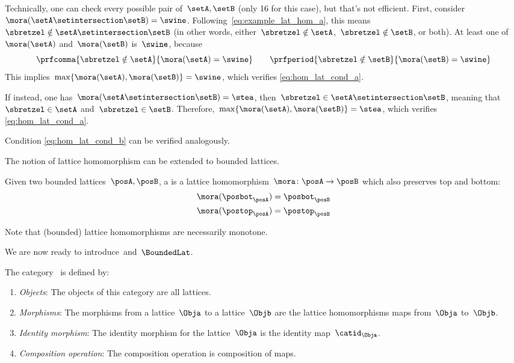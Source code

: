\begin{example}
	Technically, one can check every possible pair of~$\setA,\setB$ (only 16 for this case), but that's not efficient.
	First, consider~$\mora(\setA\setintersection \setB)=\swine$.
	Following~\cref{eq:example_lat_hom_a}, this means~$\sbretzel \notin \setA\setintersection \setB$ (in other words, either~$\sbretzel \notin \setA$,~$\sbretzel \notin \setB$, or both).
	At least one of~$\mora(\setA)$ and~$\mora(\setB)$ is~$\swine$, because
	\begin{equation*}
		\prfcomma{\sbretzel \notin \setA}{\mora(\setA)=\swine} \qquad
		\prfperiod{\sbretzel \notin \setB}{\mora(\setB)=\swine}
	\end{equation*}
	This implies~$\max\{\mora(\setA),\mora(\setB)\}=\swine$, which verifies \cref{eq:hom_lat_cond_a}.

	If instead, one has~$\mora(\setA\setintersection \setB)=\stea$, then~$\sbretzel \in \setA\setintersection \setB$, meaning that~$\sbretzel \in \setA$ and~$\sbretzel \in \setB$.
	Therefore,~$\max\{ \mora(\setA),\mora(\setB)\}=\stea$, which verifies \cref{eq:hom_lat_cond_a}.

	Condition \cref{eq:hom_lat_cond_b} can be verified analogously.
\end{example}

The notion of lattice homomorphism can be extended to bounded lattices.

\begin{ctdefinition}
	\label{def:bounded_lat_homomorphism}
	Given two bounded lattices~$\posA,\posB$, a \emph{} is a lattice homomorphism~$\mora\colon \posA\to \posB$ which also preserves top and bottom:
	\begin{equation}
		\begin{aligned}
			\mora(\posbot_\posA) & =\posbot_\posB \\
			\mora(\postop_\posA) & =\postop_\posB
		\end{aligned}
	\end{equation}
\end{ctdefinition}

Note that (bounded) lattice homomorphisms are necessarily monotone.

We are now ready to introduce~\Lat and~$\BoundedLat$.

\begin{ctdefinition}
	\label{def:Lat}
	The category~\iindex{\Lat} is defined by:
	\begin{enumerate}
		\item \emph{Objects}: The objects of this category are all lattices.
		\item \emph{Morphisms}: The morphisms from a lattice~$\Obja$ to a lattice~$\Objb$ are the lattice homomorphisms maps from~$\Obja$ to~$\Objb$.
		\item \emph{Identity morphism}: The identity morphism for the lattice~$\Obja$
		      is the identity map~$\catid_\Obja$.
		\item \emph{Composition operation}: The composition operation is composition of maps.
	\end{enumerate}
\end{ctdefinition}

